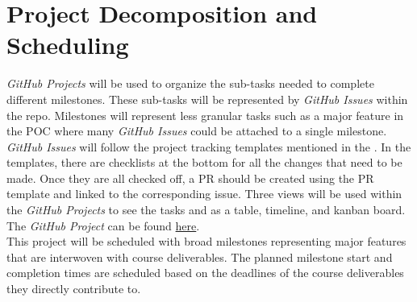 \documentclass{article}
\begin{document}
\pagebreak

\section{Project Decomposition and Scheduling} \label{project_decomposition_and_scheduling}

\textit{GitHub Projects} will be used to organize the sub-tasks needed to complete different milestones. These sub-tasks will be represented by \textit{GitHub Issues} within the repo. Milestones will represent less granular tasks such as a major feature in the POC where many \textit{GitHub Issues} could be attached to a single milestone. \textit{GitHub Issues} will follow the project tracking templates mentioned in the . In the templates, there are checklists at the bottom for all the changes that need to be made. Once they are all checked off, a PR should be created using the PR template and linked to the corresponding issue. Three views will be used within the \textit{GitHub Projects} to see the tasks and as a table, timeline, and kanban board. \\

The \textit{GitHub Project} can be found \href{ https://github.com/users/russellrd/projects/2}{here}. \\

This project will be scheduled with broad milestones representing major features that are interwoven with course deliverables. The planned milestone start and completion times are scheduled based on the deadlines of the course deliverables they directly contribute to. \\

\end{document}
